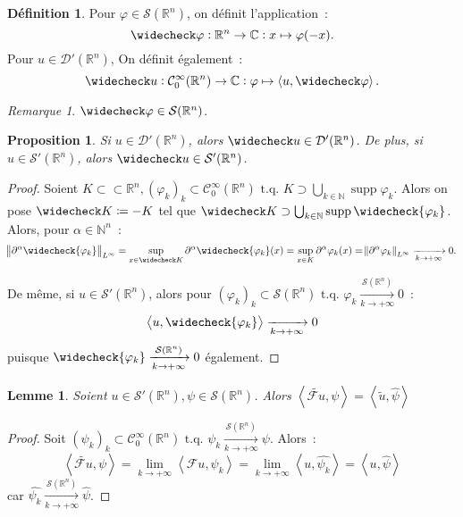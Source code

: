 \documentclass{report}
\DeclareMathOperator{\supp}{supp}
\newcommand{\C}{{\mathbb C}}
\newcommand{\R}{{\mathbb R}}
\newcommand{\N}{{\mathbb N}}
\newcommand{\scpr}[2]{\left\langle#1, #2\right\rangle}
\newcommand{\tq}{\text{ t.q. }}
\newcommand{\st}{\tq}
\newcommand{\pinfty}{{+\infty}}
\newtheorem{prp}[thm]{Proposition}
\newtheorem{lem}[thm]{Lemme}
\theoremstyle{definition}
\newtheorem{déf}[thm]{Définition}
\theoremstyle{remark}
\newtheorem*{rmq}{Remarque}
\begin{document}
\begin{déf} Pour $\varphi \in \mathcal S(\R^n)$, on définit l'application~:
\[\widecheck \varphi : \R^n \to \C : x \mapsto \varphi(-x).\]
Pour $u \in \mathcal D'(\R^n)$, On définit également~:
\[\widecheck u : \mathcal C^\infty_0(\R^n) \to \C : \varphi \mapsto \scpr u{\widecheck \varphi}.\]
\end{déf}

\begin{rmq} $\widecheck \varphi \in \mathcal S(\R^n)$.
\end{rmq}

\begin{prp} Si $u \in \mathcal D'(\R^n)$, alors $\widecheck u \in \mathcal D'(\R^n)$. De plus, si $u \in \mathcal S'(\R^n)$, alors $\widecheck u \in \mathcal S'(\R^n)$.
\end{prp}

\begin{proof} Soient $K \subset\subset \R^n, (\varphi_k)_k \subset \mathcal C^\infty_0(\R^n) \st K \supset \bigcup_{k \in \N}\supp\varphi_k$. Alors on pose
$\widecheck K \coloneqq -K$ tel que $\widecheck K \supset \bigcup_{k \in \N}\supp\widecheck {\varphi_k}$. Alors, pour $\alpha \in \N^n$~:
\[\norm {\partial^\alpha\widecheck{\varphi_k}}_{L^\infty} = \sup_{x \in \widecheck K}\partial^\alpha\widecheck {\varphi_k}(x) = \sup_{x \in K}\partial^\alpha\varphi_k(x)
= \norm {\partial^\alpha\varphi_k}_{L^\infty} \xrightarrow[k \to \pinfty]{} 0.\]

De même, si $u \in \mathcal S'(\R^n)$, alors pour $(\varphi_k)_k \subset \mathcal S(\R^n) \st \varphi_k \xrightarrow[k \to \pinfty]{\mathcal S(\R^n)} 0$~:
\[\scpr u{\widecheck {\varphi_k}} \xrightarrow[k \to \pinfty]{} 0\]
puisque $\widecheck {\varphi_k} \xrightarrow[k \to \pinfty]{\mathcal S(\R^n)} 0$ également.
\end{proof}

\begin{lem}\label{lem:Fourier distribution prolongée} Soient $u \in \mathcal S'(\R^n), \psi \in \mathcal S(\R^n)$.
Alors $\scpr {\widetilde {\mathcal Fu}}\psi = \scpr {\widetilde u}{\widehat \psi}$
\end{lem}

\begin{proof} Soit $(\psi_k)_k \subset \mathcal C^\infty_0(\R^n) \st \psi_k \xrightarrow[k \to \pinfty]{\mathcal S(\R^n)} \psi$. Alors~:
\[\scpr {\widetilde {\mathcal Fu}}\psi = \lim_{k \to \pinfty}\scpr {\mathcal Fu}{\psi_k} = \lim_{k \to \pinfty}\scpr u{\widehat {\psi_k}} = \scpr u{\widehat \psi}\]
car $\widehat {\psi_k} \xrightarrow[k \to \pinfty]{\mathcal S(\R^n)} \widehat \psi$.
\end{proof}
\end{document}
